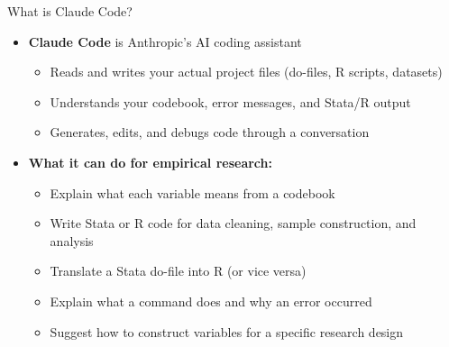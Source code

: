 \documentclass[hyperref={pdfpagelabels=false}]{beamer}
\begin{document}

\begin{frame}{What is Claude Code?}

\begin{itemize}
	\item \textbf{Claude Code} is Anthropic's AI coding assistant
	\vspace{0.2cm}
	\begin{itemize}
		\item Reads and writes your actual project files (do-files, R scripts, datasets)
		\vspace{0.15cm}
		\item Understands your codebook, error messages, and Stata/R output
		\vspace{0.15cm}
		\item Generates, edits, and debugs code through a conversation
	\end{itemize}
	\vspace{0.3cm}
	\item \textbf{What it can do for empirical research:}
	\vspace{0.15cm}
	\begin{itemize}
		\item Explain what each variable means from a codebook
		\vspace{0.15cm}
		\item Write Stata or R code for data cleaning, sample construction, and analysis
		\vspace{0.15cm}
		\item Translate a Stata do-file into R (or vice versa)
		\vspace{0.15cm}
		\item Explain what a command does and why an error occurred
		\vspace{0.15cm}
		\item Suggest how to construct variables for a specific research design
	\end{itemize}
\end{itemize}

\end{frame}


\end{document}
